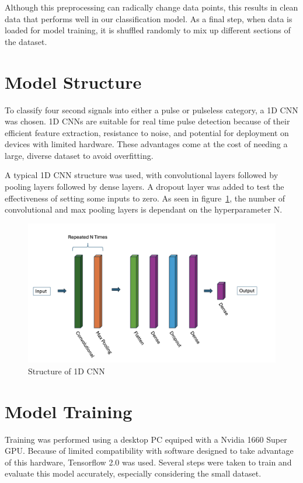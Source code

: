 \documentclass{article}
\begin{document}
Although this preprocessing can radically change data points, this results in clean data that performs well in our classification model. As a final step, when data is loaded for model training, it is shuffled randomly to mix up different sections of the dataset.


\section{Model Structure}

To classify four second signals into either a pulse or pulseless category, a 1D CNN was chosen. 1D CNNs are suitable for real time pulse detection because of their efficient feature extraction, resistance to noise, and potential for deployment on devices with limited hardware. These advantages come at the cost of needing a large, diverse dataset to avoid overfitting.

A typical 1D CNN structure was used, with convolutional layers followed by pooling layers followed by dense layers. A dropout layer was added to test the effectiveness of setting some inputs to zero. As seen in figure~\ref{fig:model}, the number of convolutional and max pooling layers is dependant on the hyperparameter N.

\begin{figure}[H]
    \centering
    \includegraphics[width=1.0\textwidth]{../media/model.png}
    \caption{Structure of 1D CNN}
    \label{fig:model}
\end{figure}


\section{Model Training} \label{training}

Training was performed using a desktop PC equiped with a Nvidia 1660 Super GPU. Because of limited compatibility with software designed to take advantage of this hardware,  Tensorflow 2.0 was used. Several steps were taken to train and evaluate this model accurately, especially considering the small dataset.
\end{document}
